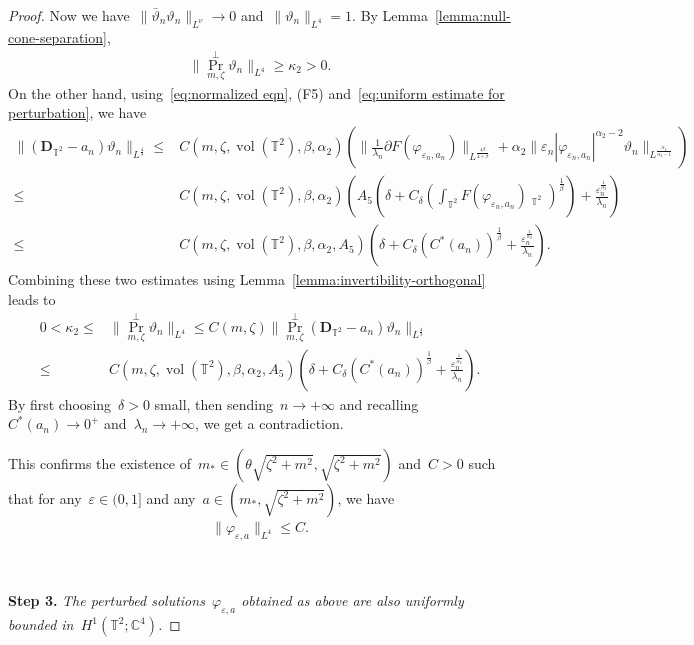 \documentclass[11pt,final]{amsart}
\newcommand{\p}{\partial}
\newcommand{\C}{\mathbb{C}}
\newcommand{\T}{\mathbb{T}}
\newcommand{\dd}{\mathop{}\!\mathrm{d}}
\newcommand{\eps}{\varepsilon}
\newcommand{\pD}{\mathbf{D}}
\newcommand{\parenthesis}[1]{\left(#1\right)} %
\DeclareMathOperator{\dv}{\dd{vol}}
\DeclareMathOperator{\proj}{Pr}
\DeclareMathOperator{\vol}{vol}
\begin{document}
\begin{proof}
Now we have~$\|\bar{\vartheta}_n\vartheta_n\|_{L^\nu}\to 0$ and~$\|\vartheta_n\|_{L^4}=1$. 
By Lemma~\ref{lemma:null-cone-separation},
\begin{align}
    \|\proj_{m,\zeta}^\perp\vartheta_n\|_{L^4}\geq \kappa_2>0. 
\end{align}
On the other hand, using~\eqref{eq:normalized eqn}, (F5) and~\eqref{eq:uniform estimate for perturbation}, we have  
\begin{align}
    \| (\pD_{\T^2}-a_n)\vartheta_n\|_{L^{\frac{4}{3}}} 
    \leq& C(m,\zeta,\vol(\mathbb{T}^2),\beta,\alpha_2)\parenthesis{ \|\frac{1}{\lambda_n}\p F(\varphi_{\eps_n,a_n})\|_{L^{\frac{4\beta}{4+\beta}} } + \alpha_2\|\eps_n|\varphi_{\eps_n,a_n}|^{\alpha_2-2}\vartheta_n \|_{L^{\frac{\alpha_2}{\alpha_2-1}} } } \\
    \leq & C(m,\zeta,\vol(\mathbb{T}^2),\beta,\alpha_2)
    \parenthesis{ A_5\parenthesis{\delta+ C_\delta \parenthesis{ \int_{\mathbb{T}^2} F(\varphi_{\eps_n,a_n})\dv_{\T^2}}^{\frac{1}{\beta}} } + \frac{\eps_n^{\frac{1}{\alpha_2}}}{\lambda_n} } \\
    \leq &  C(m,\zeta,\vol(\mathbb{T}^2),\beta,\alpha_2, A_5)
    \parenthesis{ \delta + C_\delta (C^*(a_n))^{\frac{1}{\beta} } + \frac{\eps_n^{\frac{1}{\alpha_2}}}{\lambda_n} }.
\end{align}
Combining these two estimates using Lemma~\ref{lemma:invertibility-orthogonal} leads to 
\begin{align}
   0<\kappa_2\leq & \|\proj_{m,\zeta}^\perp \vartheta_n\|_{L^4}
    \leq C(m,\zeta) \|\proj_{m,\zeta}^\perp (\pD_{\T^2}-a_n)\vartheta_n\|_{L^{\frac{4}{3}}}  \\
    \leq & C(m,\zeta,\vol(\mathbb{T}^2),\beta,\alpha_2, A_5)
    \parenthesis{ \delta + C_\delta (C^*(a_n))^{\frac{1}{\beta} } + \frac{\eps_n^{\frac{1}{\alpha_2}}}{\lambda_n} }.
\end{align}
By first choosing~$\delta>0$ small, then sending~$n\to+\infty$ and recalling~$C^*(a_n)\to 0^+$ and~$\lambda_n\to+\infty$, we get a contradiction. 

This confirms the existence of~$m_*\in (\theta\sqrt{\zeta^2+m^2},\sqrt{\zeta^2+m^2})$ and~$C>0$ such that for any~$\eps\in (0,1]$ and any~$a\in (m_*,\sqrt{\zeta^2+m^2})$, we have 
\begin{align}
    \|\varphi_{\eps,a}\|_{L^4}\leq C. 
\end{align} 

\ 

\noindent\textbf{Step 3.} \emph{The perturbed solutions~$\varphi_{\eps,a}$ obtained as above are also uniformly bounded in~$H^1(\T^2;\C^4)$.}


\end{proof}
\end{document}
